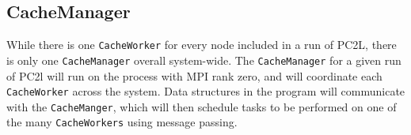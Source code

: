 \subsection{CacheManager}
While there is one \texttt{CacheWorker} for every node included in a run of PC2L, there is only one \texttt{CacheManager} overall system-wide. The \texttt{CacheManager} for a given run of PC2l will run on the process with MPI rank zero, and will coordinate each \texttt{CacheWorker} across the system. Data structures in the program will communicate with the \texttt{CacheManger}, which will then schedule tasks to be performed on one of the many \texttt{CacheWorkers} using message passing.  


